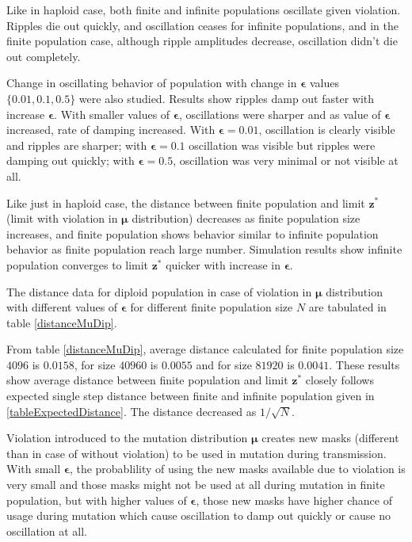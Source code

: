 Like in haploid case, both finite and infinite populations oscillate given violation. Ripples die out quickly, 
and oscillation ceases for infinite populations, and in the finite population case, although ripple amplitudes decrease, 
oscillation didn't die out completely. 

Change in oscillating behavior of population with change in $\bm{\epsilon}$ values $\{0.01, 0.1, 0.5\}$ were also studied. 
Results show ripples damp out faster with increase $\bm{\epsilon}$.
With smaller values of $\bm{\epsilon}$, oscillations were sharper and as value of $\bm{\epsilon}$ increased, 
rate of damping increased. With $\bm{\epsilon} = 0.01$, oscillation is clearly visible and ripples are sharper; with $\bm{\epsilon} = 0.1$ oscillation was visible 
but ripples were damping out quickly;  with $\bm{\epsilon} = 0.5$, oscillation was very minimal or not visible at all. 

Like just in haploid case, the distance between finite population and limit $\bm{z}^\ast$ (limit with violation in $\bm{\mu}$ distribution) 
decreases as finite population size increases, 
and finite population shows behavior similar to infinite population behavior as finite population reach large number. 
Simulation results show infinite population converges 
to limit $\bm{z^\ast}$ quicker with increase in $\bm{\epsilon}$. 

The distance data for diploid population in case of violation in $\bm{\mu}$ distribution 
with different values of $\bm{\epsilon}$ for different finite population size $N$ are tabulated in table \ref{distanceMuDip}.



From table \ref{distanceMuDip}, average distance calculated for finite population size $4096$ is $0.0158$, 
for size $40960$ is $0.0055$ and for size $81920$ is $0.0041$. These results show average distance 
between finite population and limit $\bm{z^\ast}$ closely follows expected single step distance 
between finite and infinite population given in \ref{tableExpectedDistance}. The distance decreased as $1/\sqrt{N}$.

Violation introduced to the mutation distribution $\bm{\mu}$ creates new masks (different than in case of without violation) to be used in mutation 
during transmission. With small $\bm{\epsilon}$, the probablility of using the new masks available due to violation is very small and 
those masks might not be used at all during mutation in finite population, but with higher values of $\bm{\epsilon}$, 
those new masks have higher chance of usage during mutation which cause oscillation to damp out quickly or cause no oscillation at all.

